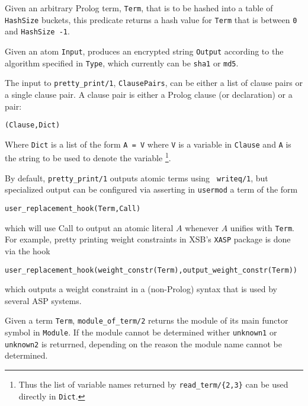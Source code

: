 \begin{description}

%
Given an arbitrary Prolog term, {\tt Term}, that is to be hashed into
a table of {\tt HashSize} buckets, this predicate returns a hash value
for {\tt Term} that is between {\tt 0} and {\tt HashSize -1}.

%
Given an atom {\tt Input}, produces an encrypted string {\tt Output}
according to the algorithm specified in {\tt Type}, which currently
can be {\tt sha1} or {\tt md5}.




%
The input to {\tt pretty\_print/1}, {\tt ClausePairs}, can be either a
list of clause pairs or a single clause pair.  A clause pair is either
a Prolog clause (or declaration) or a pair:
%
\begin{center}
{\tt (Clause,Dict)} 
\end{center}
%
Where {\tt Dict} is a list of the form {\tt A = V} where {\tt V} is a
variable in {\tt Clause} and {\tt A} is the string to be used to
denote the variable \footnote{Thus the list of variable names returned
by {\tt read\_term/\{2,3\}} can be used directly in {\tt Dict}.}.

By default, {\tt pretty\_print/1} outputs atomic terms using {\tt
writeq/1}, but specialized output can be configured via asserting in
{\tt usermod} a term of the form
%
\begin{center}
{\tt user\_replacement\_hook(Term,Call)}
\end{center}
%
which will use Call to output an atomic literal $A$ whenever $A$
unifies with {\tt Term}.  For example, pretty printing weight
constraints in XSB's {\tt XASP} package is done via the hook
%
\begin{center}
{\tt user\_replacement\_hook(weight\_constr(Term),output\_weight\_constr(Term))}
\end{center}
%
which outputs a weight constraint in a (non-Prolog) syntax that is 
used by several ASP systems.

%
Given a term {\tt Term}, {\tt module\_of\_term/2} returns the module
of its main functor symbol in {\tt Module}.  If the module cannot be
determined wither {\tt unknown1} or {\tt unknown2} is returrned,
depending on the reason the module name cannot be determined.

\end{description}


